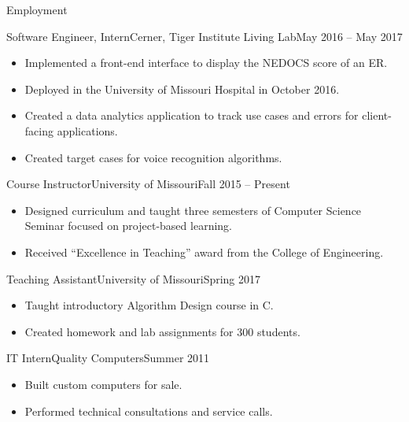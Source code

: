 \documentclass[]{mcdowellcv}
\begin{document}
    \begin{cvsection}{Employment}
        \begin{cvsubsection}{Software Engineer, Intern}{Cerner, Tiger Institute Living Lab}{May 2016 -- May 2017}		
            \begin{itemize}
                \item Implemented a front-end interface to display the NEDOCS score of an ER.
                \item Deployed in the University of Missouri Hospital in October 2016.
                \item Created a data analytics application to track use cases and errors for client-facing applications.
                \item Created target cases for voice recognition algorithms.
            \end{itemize}
        \end{cvsubsection}
        
        \begin{cvsubsection}{Course Instructor}{University of Missouri}{Fall 2015 -- Present}
            \begin{itemize}
                \item Designed curriculum and taught three semesters of Computer Science Seminar focused on project-based learning.
                \item Received “Excellence in Teaching” award from the College of Engineering.
            \end{itemize}
        \end{cvsubsection}
        
        \begin{cvsubsection}{Teaching Assistant}{University of Missouri}{Spring 2017}
            \begin{itemize}
                \item Taught introductory Algorithm Design course in C.
                \item Created homework and lab assignments for 300 students.
            \end{itemize}
        \end{cvsubsection}
        
        \begin{cvsubsection}{IT Intern}{Quality Computers}{Summer 2011}	
            \begin{itemize}
                \item Built custom computers for sale.
                \item Performed technical consultations and service calls.
            \end{itemize}
        \end{cvsubsection}
    \end{cvsection}	
    
\end{document}
